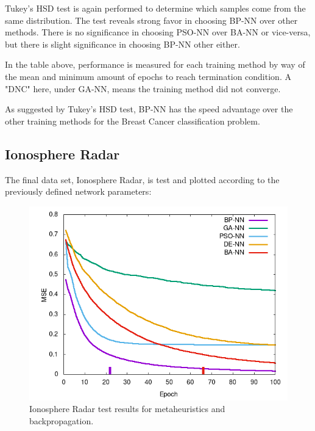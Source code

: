 \documentclass[a4paper,12pt]{article}
\begin{document}
Tukey's HSD test is again performed to determine which samples come from the same distribution. The test reveals strong favor in choosing BP-NN over other methods. There is no significance in choosing PSO-NN over BA-NN or vice-versa, but there is slight significance in choosing BP-NN other either.

\begin{table}[h!]
\centering
{}
\caption{Minimum and average time to terminate for Breast Cancer set.}
\label{Tab:breast-min}
\end{table}

In the table above, performance is measured for each training method by way of the mean and minimum amount of epochs to reach termination condition. A "DNC" here, under GA-NN, means the training method did not converge.

As suggested by Tukey's HSD test, BP-NN has the speed advantage over the other training methods for the Breast Cancer classification problem.

\pagebreak

\subsection{Ionosphere Radar}

The final data set, Ionosphere Radar, is test and plotted according to the previously defined network parameters:

\begin{figure}[h!]
\centering
\includegraphics[scale=0.60]{images/ionosphere-plot.png}
\caption{Ionosphere Radar test results for metaheuristics and backpropagation.}
\label{fig:ionosphere}
\end{figure}
\end{document}
